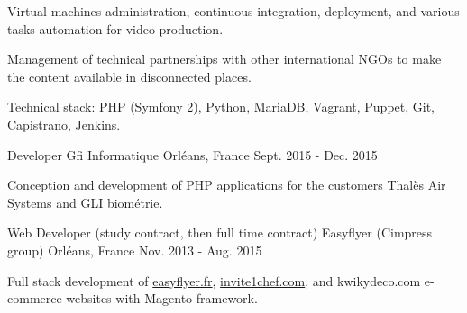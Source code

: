 \begin{cventries}
{\begin{cvitems}
        \item {Virtual machines administration, continuous integration, deployment, and various tasks automation for video production.}
        \item {Management of technical partnerships with other international NGOs to make the content available in disconnected places.}
        \item {Technical stack: PHP (Symfony 2), Python, MariaDB, Vagrant, Puppet, Git, Capistrano, Jenkins.}
      \end{cvitems}
    }
  \cventry
    {Developer}
    {Gfi Informatique}
    {Orléans, France}
    {Sept. 2015 - Dec. 2015}
    {
      \begin{cvitems}
        \item {Conception and development of PHP applications for the customers Thalès Air Systems and GLI biométrie.}
      \end{cvitems}
    }
  \cventry
    {Web Developer (study contract, then full time contract)}
    {Easyflyer (Cimpress group)}
    {Orléans, France}
    {Nov. 2013 - Aug. 2015}
    {
      \begin{cvitems}
        \item {Full stack development of \href{https://www.easyflyer.fr}{easyflyer.fr}, \href{https://www.invite1chef.com}{invite1chef.com}, and kwikydeco.com e-commerce websites with Magento framework.}
      \end{cvitems}
    }
\end{cventries}
